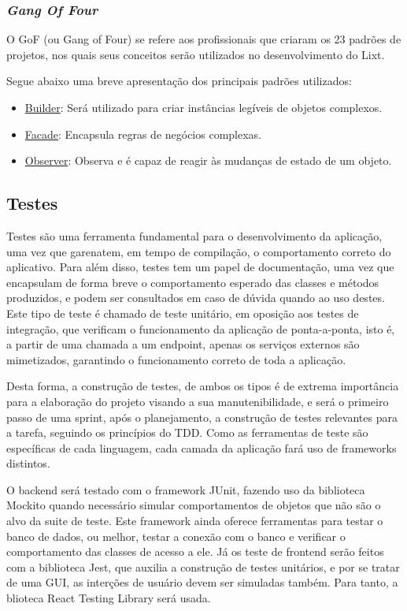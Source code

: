 \subsubsection{\emph{Gang Of Four}}

O GoF (ou Gang of Four) se refere aos profissionais que criaram os 23 padrões de projetos, nos quais seus conceitos serão utilizados no desenvolvimento do Lixt.

Segue abaixo uma breve apresentação dos principais padrões utilizados:

\begin{itemize}
	\item \underline{Builder}: Será utilizado para criar instâncias legíveis de objetos complexos.
	\item \underline{Facade}: Encapsula regras de negócios complexas.
	\item \underline{Observer}: Observa e é capaz de reagir às mudanças de estado de um objeto.
\end{itemize}

\subsection{Testes}

Testes são uma ferramenta fundamental para o desenvolvimento da
aplicação, uma vez que garenatem, em tempo de compilação, o
comportamento correto do aplicativo. Para além disso, testes tem um
papel de documentação, uma vez que encapsulam de forma breve o
comportamento esperado das classes e métodos produzidos, e podem ser
consultados em caso de dúvida quando ao uso destes. Este tipo de teste
é chamado de teste unitário, em oposição aos testes de integração, que
verificam o funcionamento da aplicação de ponta-a-ponta, isto é, a
partir de uma chamada a um endpoint, apenas os serviços externos são
mimetizados, garantindo o funcionamento correto de toda a aplicação.

Desta forma, a construção de testes, de ambos os tipos é de extrema
importância para a elaboração do projeto visando a sua
manutenibilidade, e será o primeiro passo de uma sprint, após o
planejamento, a construção de testes relevantes para a tarefa,
seguindo os princípios do TDD\cite{TDD}. Como as ferramentas de teste são
específicas de cada linguagem, cada camada da aplicação fará uso de
frameworks distintos.

O \gls{backend} será testado com o framework JUnit, fazendo uso da
biblioteca Mockito quando necessário simular comportamentos de objetos
que não são o alvo da suite de teste. Este framework ainda oferece
ferramentas para testar o banco de dados, ou melhor, testar a conexão
com o banco e verificar o comportamento das classes de acesso a ele.
Já os teste de \gls{frontend} serão feitos com a biblioteca Jest,
que auxilia a construção de testes unitários, e por se tratar de uma
\gls{GUI}, as interções de usuário devem ser simuladas também. Para tanto, a
blioteca React Testing Library será usada.

